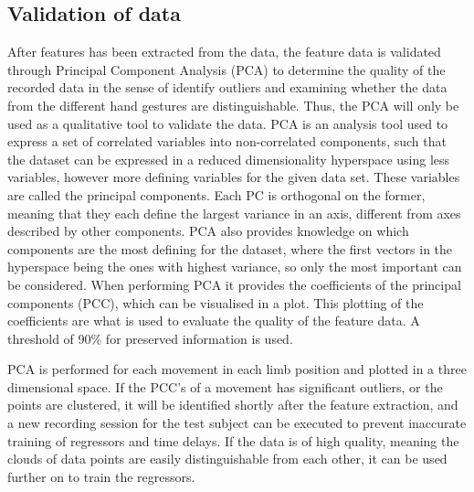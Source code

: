 \subsection{Validation of data}


After features has been extracted from the data, the feature data is validated through Principal Component Analysis (PCA) to determine the quality of the recorded data in the sense of identify outliers and examining whether the data from the different hand gestures are distinguishable. Thus, the PCA will only be used as a qualitative tool to validate the data. %
PCA is an analysis tool used to express a set of correlated variables into non-correlated components, such that the dataset can be expressed in a reduced dimensionality hyperspace using less variables, however more defining variables for the given data set. These variables are called the principal components. Each PC is orthogonal on the former, meaning that they each define the largest variance in an axis, different from axes described by other components. PCA also provides knowledge on which components are the most defining for the dataset, where the first vectors in the hyperspace being the ones with highest variance, so only the most important can be considered. When performing PCA it provides the coefficients of the principal components (PCC), which can be visualised in a plot. This plotting of the coefficients are what is used to evaluate the quality of the feature data. A threshold of 90\% for preserved information is used. 

PCA is performed for each movement in each limb position and plotted in a three dimensional space. If the PCC's of a movement has significant outliers, or the points are clustered, it will be identified shortly after the feature extraction, and a new recording session for the test subject can be executed to prevent inaccurate training of regressors and time delays. If the data is of high quality, meaning the clouds of data points are easily distinguishable from each other, it can be used further on to train the regressors.

